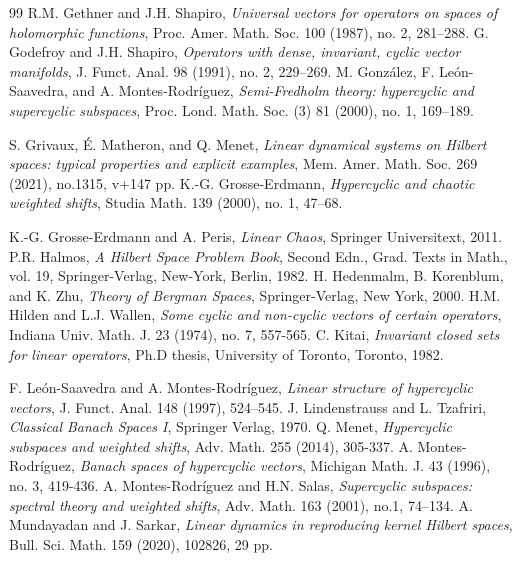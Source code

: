 \documentclass[12pt, reqno]{amsart}
\theoremstyle{definition}
\theoremstyle{remark}
\numberwithin{equation}{section}
\begin{document}
\begin{thebibliography}{99}
 R.M. Gethner and J.H. Shapiro, \textit{Universal vectors for operators on spaces of holomorphic functions}, Proc. Amer. Math. Soc. 100 (1987), no. 2, 281–288. 
 G. Godefroy and J.H. Shapiro, \textit{Operators with dense,
invariant, cyclic vector manifolds}, J. Funct. Anal. 98 (1991), no. 2, 229–269.
 M. Gonz\'{a}lez, F. Le\'{o}n-Saavedra, and A. Montes-Rodr\'{i}guez, \textit{Semi-Fredholm theory: hypercyclic and supercyclic subspaces}, Proc. Lond. Math. Soc. (3) 81 (2000), no. 1, 169–189. 

 S. Grivaux, \'{E}. Matheron, and Q. Menet, \textit {Linear dynamical systems on Hilbert spaces: typical properties and explicit examples}, Mem. Amer. Math. Soc. 269 (2021), no.1315, v+147 pp.
 K.-G. Grosse-Erdmann, \emph{Hypercyclic and chaotic weighted shifts}, Studia Math. 139 (2000), no. 1, 47–68.

 K.-G. Grosse-Erdmann and A. Peris, \emph{Linear Chaos}, Springer Universitext,
2011.
 P.R. Halmos, \textit{A Hilbert Space Problem Book}, Second Edn., Grad. Texts in Math., vol. 19, Springer-Verlag, New-York, Berlin, 1982. 
 H. Hedenmalm, B. Korenblum, and K. Zhu, \emph{Theory of Bergman Spaces}, Springer-Verlag, New York, 2000.
 H.M. Hilden and L.J. Wallen, \textit{Some cyclic and non-cyclic vectors of certain operators}, Indiana Univ. Math. J. 23 (1974), no. 7, 557-565.
 C. Kitai, \textit{Invariant closed sets for linear operators}, Ph.D thesis, University of Toronto, Toronto, 1982.


 F. Le\'{o}n-Saavedra and A. Montes-Rodr\'{i}guez, \textit{Linear structure of hypercyclic vectors}, J. Funct. Anal. 148 (1997), 524–545.
 J. Lindenstrauss and L. Tzafriri, \textit{Classical Banach Spaces I}, Springer Verlag, 1970.
 Q. Menet, \textit{Hypercyclic subspaces and weighted shifts}, Adv. Math. 255 (2014), 305-337.
 A. Montes-Rodr\'{i}guez, \textit{Banach spaces of hypercyclic vectors}, Michigan Math. J. 43 (1996), no. 3, 419-436.
 A. Montes-Rodríguez and H.N. Salas, \textit{Supercyclic subspaces: spectral theory and weighted shifts}, Adv. Math. 163 (2001), no.1, 74–134.
 A. Mundayadan and J. Sarkar, \textit{Linear dynamics in reproducing kernel Hilbert spaces}, Bull. Sci. Math. 159 (2020), 102826, 29 pp.


\end{thebibliography}
\end{document}
